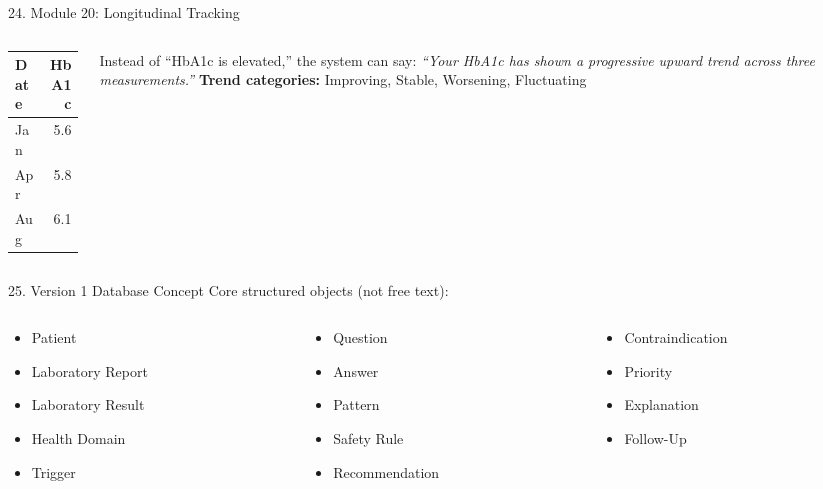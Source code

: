 \documentclass[10pt,aspectratio=169]{beamer}
\begin{document}
\begin{frame}{24. Module 20: Longitudinal Tracking}
\begin{columns}[T]
\begin{column}{0.45\textwidth}
\small
\begin{tabular}{lr}
\toprule
Date & HbA1c \\
\midrule
Jan & 5.6 \\
Apr & 5.8 \\
Aug & 6.1 \\
\bottomrule
\end{tabular}
\end{column}
\begin{column}{0.55\textwidth}
\small
Instead of ``HbA1c is elevated,'' the system can say: \textit{``Your HbA1c has shown a progressive upward trend across three measurements.''}
\vspace{8pt}
\textbf{Trend categories:} Improving, Stable, Worsening, Fluctuating
\end{column}
\end{columns}
\end{frame}

\begin{frame}{25. Version 1 Database Concept}
\scriptsize
Core structured objects (not free text):
\begin{columns}[T]
\begin{column}{0.33\textwidth}
\begin{itemize}
\item Patient
\item Laboratory Report
\item Laboratory Result
\item Health Domain
\item Trigger
\end{itemize}
\end{column}
\begin{column}{0.33\textwidth}
\begin{itemize}
\item Question
\item Answer
\item Pattern
\item Safety Rule
\item Recommendation
\end{itemize}
\end{column}
\begin{column}{0.33\textwidth}
\begin{itemize}
\item Contraindication
\item Priority
\item Explanation
\item Follow-Up
\end{itemize}
\end{column}
\end{columns}
\end{frame}
\end{document}
